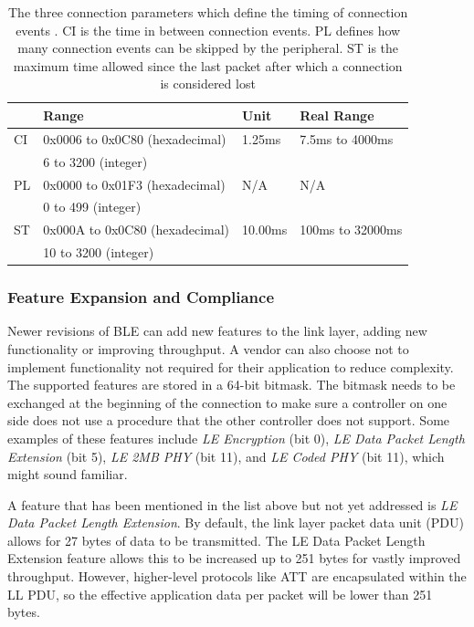 \begin{table}
    \begin{center}
    \begin{tabular}{|l|l|l|l|}
        \hline
         & \textbf{Range} & \textbf{Unit} & \textbf{Real Range} \\
        \hline
        CI          & 0x0006 to 0x0C80 (hexadecimal) & 1.25ms &  7.5ms to 4000ms  \\
                    & 6 to 3200 (integer) & & \\
        \hline
        PL          & 0x0000 to 0x01F3 (hexadecimal) & N/A & N/A \\
                    & 0 to 499 (integer) & & \\
        \hline
        ST          & 0x000A to 0x0C80 (hexadecimal) & 10.00ms & 100ms to 32000ms \\
                    & 10 to 3200 (integer) & & \\
        \hline
    \end{tabular}
    \end{center}
    \caption{The three connection parameters which define the timing of connection events \cite{bluetooth_spec}. CI is the time in between connection events. PL defines how many connection events can be skipped by the peripheral. ST is the maximum time allowed since the last packet after which a connection is considered lost}
    \label{tbl:conn_params}
\end{table}


\subsubsection{Feature Expansion and Compliance}
Newer revisions of BLE can add new features to the link layer, adding new functionality or improving throughput. A vendor can also choose not to implement functionality not required for their application to reduce complexity. The supported features are stored in a 64-bit bitmask. The bitmask needs to be exchanged at the beginning of the connection to make sure a controller on one side does not use a procedure that the other controller does not support. Some examples of these features include \textit{LE Encryption} (bit 0), \textit{LE Data Packet Length Extension} (bit 5), \textit{LE 2MB PHY} (bit 11), and \textit{LE Coded PHY} (bit 11), which might sound familiar\cite[p. 2827]{bluetooth_spec}.

A feature that has been mentioned in the list above but not yet addressed is \textit{LE Data Packet Length Extension}. By default, the link layer packet data unit (PDU) allows for 27 bytes of data to be transmitted. The LE Data Packet Length Extension feature allows this to be increased up to 251 bytes for vastly improved throughput. However, higher-level protocols like ATT are encapsulated within the LL PDU, so the effective application data per packet will be lower than 251 bytes.

